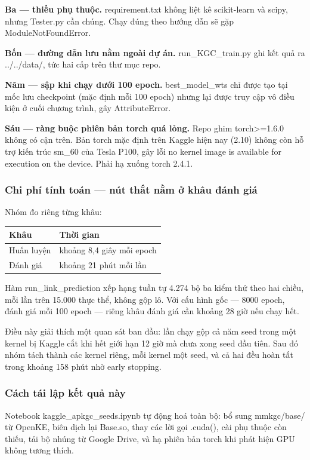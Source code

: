 \documentclass[11pt,a4paper]{article}
\newcommand{\code}[1]{{\ttfamily\small\color{codetext}#1}}
\begin{document}
\textbf{Ba --- thiếu phụ thuộc.} \code{requirement.txt} không liệt kê \code{scikit-learn} và \code{scipy}, nhưng \code{Tester.py} cần chúng. Chạy đúng theo hướng dẫn sẽ gặp \code{ModuleNotFoundError}.

\textbf{Bốn --- đường dẫn lưu nằm ngoài dự án.} \code{run\_KGC\_train.py} ghi kết quả ra \code{../../data/}, tức hai cấp trên thư mục repo.

\textbf{Năm --- sập khi chạy dưới 100 epoch.} \code{best\_model\_wts} chỉ được tạo tại mốc lưu checkpoint (mặc định mỗi 100 epoch) nhưng lại được truy cập vô điều kiện ở cuối chương trình, gây \code{AttributeError}.

\textbf{Sáu --- ràng buộc phiên bản torch quá lỏng.} Repo ghim \code{torch>=1.6.0} không có cận trên. Bản torch mặc định trên Kaggle hiện nay (2.10) không còn hỗ trợ kiến trúc sm\_60 của Tesla P100, gây lỗi \code{no kernel image is available for execution on the device}. Phải hạ xuống torch 2.4.1.

\subsubsection{Chi phí tính toán --- nút thắt nằm ở khâu đánh giá}
Nhóm đo riêng từng khâu:

\begin{center}\small
\begin{tabular}{@{}ll@{}}
\toprule
\textbf{Khâu} & \textbf{Thời gian}\\
\midrule
Huấn luyện & khoảng 8,4 giây mỗi epoch\\
Đánh giá & khoảng 21 phút mỗi lần\\
\bottomrule
\end{tabular}
\end{center}
Hàm \code{run\_link\_prediction} xếp hạng tuần tự 4.274 bộ ba kiểm thử theo hai chiều, mỗi lần trên 15.000 thực thể, không gộp lô. Với cấu hình gốc --- 8000 epoch, đánh giá mỗi 100 epoch --- riêng khâu đánh giá cần khoảng 28 giờ nếu chạy hết.

Điều này giải thích một quan sát ban đầu: lần chạy gộp cả năm seed trong một kernel bị Kaggle cắt khi hết giới hạn 12 giờ mà chưa xong seed đầu tiên. Sau đó nhóm tách thành các kernel riêng, mỗi kernel một seed, và cả hai đều hoàn tất trong khoảng 158 phút nhờ early stopping.

\subsubsection{Cách tái lập kết quả này}
Notebook \code{kaggle\_apkgc\_seeds.ipynb} tự động hoá toàn bộ: bổ sung \code{mmkgc/base/} từ OpenKE, biên dịch lại \code{Base.so}, thay các lời gọi \code{.cuda()}, cài phụ thuộc còn thiếu, tải bộ nhúng từ Google Drive, và hạ phiên bản torch khi phát hiện GPU không tương thích.
\end{document}
